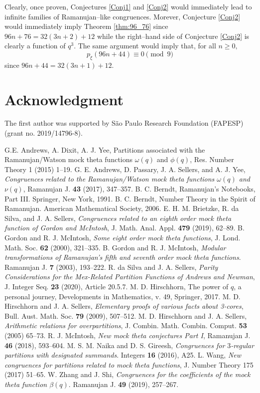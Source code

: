 \documentclass[12pt]{article}
\begin{document}
Clearly, once proven, Conjectures \ref{Conj1} and \ref{Conj2} would immediately lead to infinite families of Ramanujan--like congruences.  Morever, Conjecture \ref{Conj2} would immediately imply Theorem \ref{thm:96_76} since $96n+76 = 32(3n+2)+12$ while the right--hand side of Conjecture \ref{Conj2} is clearly a function of $q^3.$  The same argument would imply that, for all $n\geq 0,$ 
$$p_{\xi}(96n+44)  \equiv 0 \pmod{9}$$
since $96n+44 = 32(3n+1)+12.$  



\section*{Acknowledgment}

The first author was supported by S\~ao Paulo Research Foundation (FAPESP) (grant no. 2019/14796-8).

\begin{thebibliography}{99}
 G.E. Andrews, A. Dixit, A. J. Yee, {Partitions associated with the Ramanujan/Watson mock theta functions $\omega(q)$ and $\phi(q)$}, Res. Number Theory {1} (2015) 1--19.
 G. E. Andrews, D. Passary, J. A. Sellers, and A. J. Yee, {\it Congruences related to the Ramanujan/Watson mock theta functions $\omega(q)$ and $\nu(q)$}, Ramanujan J. {\bf 43} (2017), 347--357.
 B. C. Berndt, {Ramanujan's Notebooks}, Part III. Springer, New York, 1991.
 B. C. Berndt, {Number Theory in the Spirit of Ramanujan}. American Mathematical Society, 2006.
 E. H. M. Brietzke, R. da Silva, and J. A. Sellers, {\it Congruences related to an eighth order mock theta function of Gordon and McIntosh}, J. Math. Anal. Appl. {\bf 479} (2019), 62--89.
 B. Gordon and R. J. McIntosh, {\it Some eight order mock theta functions}, J. Lond. Math. Soc. {\bf 62} (2000), 321--335.
 B. Gordon and R. J. McIntosh, {\it Modular transformations of Ramanujan's fifth and seventh order mock theta functions}. Ramanujan J. {\bf 7} (2003), 193--222.
 R. da Silva and J. A. Sellers, {\it Parity Considerations for the Mex-Related Partition Functions of Andrews and Newman}, J. Integer Seq. {\bf 23} (2020), Article 20.5.7.
 M. D. Hirschhorn, {The power of $q$, a personal journey}, Developments in Mathematics, v. 49, Springer, 2017.
 M. D. Hirschhorn and J. A. Sellers, {\it Elementary proofs of various facts about 3-cores}, Bull. Aust. Math. Soc. {\bf 79} (2009), 507–512.
 M. D. Hirschhorn and J. A. Sellers, {\it Arithmetic relations for overpartitions}, J. Combin. Math. Combin. Comput. {\bf 53} (2005) 65--73.
 R. J. McIntosh, {\it New mock theta conjectures Part I}, Ramanujan J. {\bf 46} (2018), 593--604.
 M. S. M. Naika and D. S. Gireesh, \textit{Congruences for $3$-regular partitions with designated summands}. Integers {\bf 16} (2016), A25.
 L. Wang, {\it New congruences for partitions related to mock theta functions}, J. Number Theory {175} (2017) 51--65.
 W. Zhang and J. Shi, {\it Congruences for the coefficients of the mock theta function $\beta(q)$}. Ramanujan J. {\bf 49} (2019), 257--267.
\end{thebibliography}
\end{document}
